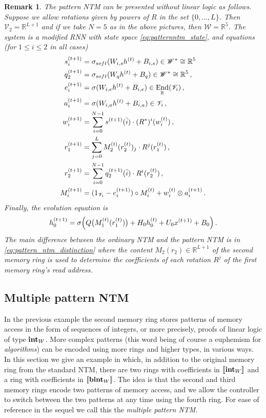 \documentclass[english,letter paper,12pt,leqno]{article}
\theoremstyle{example}
\newtheorem{remark}[theorem]{Remark}
\numberwithin{equation}{section}
\def\be{\begin{equation}}
\def\ee{\end{equation}}
\DeclareMathOperator{\End}{End}
\begin{document}
\begin{remark}\label{remark:alt_presentation} The pattern NTM can be presented without linear logic as follows. Suppose we allow rotations given by powers of $R$ in the set $\{0,\ldots,L\}$. Then $\mathscr{V}_2 = \mathbb{R}^{L+1}$ and if we take $N = 5$ as in the above pictures, then $\mathscr{W} = \mathbb{R}^5$. The system is a modified RNN with state space \eqref{eq:patternntm_state}, and equations (for $1 \le i \le 2$ in all cases)
\begin{align}
s_i^{(t+1)} &= \softmax( W_{i,s} h^{(t)} + B_{i,s} ) \in \mathscr{W}^* \cong \mathbb{R}^5\,\\
q_2^{(t+1)} &= \softmax( W_q h^{(t)} + B_q ) \in \mathscr{W}^* \cong \mathbb{R}^5\,,\\
e_i^{(t+1)} &= \relu( W_{i,e} h^{(t)} + B_{i,e} ) \in \End_{\mathbb{R}}(\mathscr{V}_i)\,,\\
a_i^{(t+1)} &= \relu( W_{i,a} h^{(t)} + B_{i,a} ) \in \mathscr{V}_i\,,\\
w_i^{(t+1)} &= \sum_{i=0}^{N-1} s^{(t+1)}(\bar{i}) \cdot (R^*)^i( w^{(t)}_i )\,,\\
r_1^{(t+1)} &= \sum_{j=0}^L M_2^{(t)}(r_2^{(t)})_j \cdot R^j(r_1^{(t)})\,,\label{eq:pattern_ntm_distinction}\\
r_2^{(t+1)} &= \sum_{i=0}^{N-1} q_2^{(t+1)}(\bar{i}) \cdot R^i( r_2^{(t)} )\,,\\
M_i^{(t+1)} &= (1_{\mathscr{V}_i} - e_i^{(t+1)}) \circ M_i^{(t)} + w_i^{(t)} \otimes a_i^{(t+1)}\,.
\end{align}
Finally, the evolution equation is
\be
h_0^{(t+1)} = \relu\Big( Q\big( M_1^{(t)}(r_1^{(t)}) \big) + H_0 h_0^{(t)} + U_0 x^{(t+1)} + B_0 \Big)\,.
\ee
The main difference between the ordinary NTM and the pattern NTM is in \eqref{eq:pattern_ntm_distinction} where the content $M_2(r_2) \in \mathbb{R}^{L+1}$ of the second memory ring is used to determine the coefficients of each rotation $R^j$ of the first memory ring's read address.
\end{remark}

\subsection{Multiple pattern NTM}\label{example:ntm_super}

In the previous example the second memory ring stores patterns of memory access in the form of sequences of integers, or more precisely, proofs of linear logic of type $\textbf{int}_W$. More complex patterns (this word being of course a euphemism for \emph{algorithms}) can be encoded using more rings and higher types, in various ways. In this section we give an example in which, in addition to the original memory ring from the standard NTM, there are two rings with coefficients in $\llbracket \textbf{int}_W \rrbracket$ and a ring with coefficients in $\llbracket \textbf{bint}_W \rrbracket$. The idea is that the second and third memory rings encode two patterns of memory access, and we allow the controller to switch between the two patterns at any time using the fourth ring. For ease of reference in the sequel we call this the \emph{multiple pattern NTM}.
\end{document}
